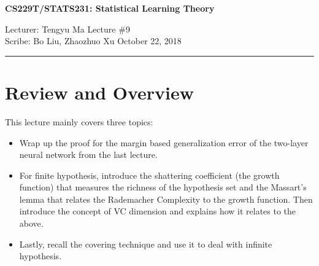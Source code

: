 \documentclass[11pt]{article}
\newcommand{\draftnotice}{\vbox to 0.25in{\noindent
   \raisebox{0.6in}[0in][0in]{\makebox[\textwidth][r]{\it
    DRAFT --- a final version will be posted shortly}}}
   \vspace{-.25in}\vspace{-\baselineskip}
}
\theoremstyle{definition}
\theoremstyle{remark}
\begin{document}
\thispagestyle{empty}


\begin{center}
\bf\large CS229T/STATS231: Statistical Learning Theory
\end{center}

\noindent
Lecturer: Tengyu Ma   %
\hfill
Lecture \#9               %
\\
Scribe: Bo Liu, Zhaozhuo Xu                 %
\hfill
October 22, 2018           %

\noindent
\rule{\textwidth}{1pt}

\medskip


\section{Review and Overview}
This lecture mainly covers three topics:
\begin{itemize}
	\item Wrap up the proof for the margin based generalization error of the two-layer neural network from the last lecture.
	\item For finite hypothesis, introduce the shattering coefficient (the growth function) that measures the richness of the hypothesis set and the Massart's lemma that relates the Rademacher Complexity to the growth function. Then introduce the concept of VC dimension and explains how it relates to the above.
	\item Lastly, recall the covering technique and use it to deal with infinite hypothesis.
\end{itemize}  
\end{document}
